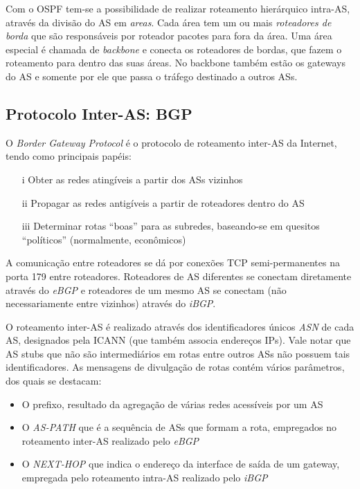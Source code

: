 Com o OSPF tem-se a possibilidade de realizar roteamento hierárquico intra-AS, através da divisão do AS em \emph{areas}.
Cada área tem um ou mais \emph{roteadores de borda} que são responsáveis por roteador pacotes para fora da área.
Uma área especial é chamada de \emph{backbone} e conecta os roteadores de bordas, que fazem o roteamento para dentro das suas áreas.
No backbone também estão os gateways do AS e somente por ele que passa o tráfego destinado a outros ASs.

\subsection{Protocolo Inter-AS: BGP}

O \emph{Border Gateway Protocol} é o protocolo de roteamento inter-AS da Internet, tendo como principais papéis:
\begin{itemize}
	\item[i] Obter as redes atingíveis a partir dos ASs vizinhos
	\item[ii] Propagar as redes antigíveis a partir de roteadores dentro do AS
	\item[iii] Determinar rotas ``boas'' para as subredes, baseando-se em quesitos ``políticos'' (normalmente, econômicos)
\end{itemize}

A comunicação entre roteadores se dá por conexões TCP semi-permanentes na porta 179 entre roteadores.
Roteadores de AS diferentes se conectam diretamente através do \emph{eBGP} 
e roteadores de um mesmo AS se conectam (não necessariamente entre vizinhos) através do \emph{iBGP}.

O roteamento inter-AS é realizado através dos identificadores únicos \emph{ASN} de cada AS, designados pela ICANN (que também associa endereços IPs).
Vale notar que AS stubs que não são intermediários em rotas entre outros ASs não possuem tais identificadores.
As mensagens de divulgação de rotas contém vários parâmetros, dos quais se destacam:
\begin{itemize}
	\item O prefixo, resultado da agregação de várias redes acessíveis por um AS
	\item O \emph{AS-PATH} que é a sequência de ASs que formam a rota, empregados no roteamento inter-AS realizado pelo \emph{eBGP}
	\item O \emph{NEXT-HOP} que indica o endereço da interface de saída de um gateway, empregada pelo roteamento intra-AS realizado pelo \emph{iBGP}
\end{itemize}

